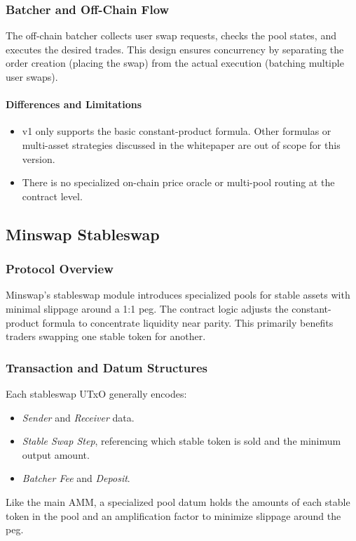 \documentclass{article}
\begin{document}
\subsubsection{Batcher and Off-Chain Flow}
The off-chain batcher collects user swap requests, checks the pool states, and executes the desired trades. This design ensures concurrency by separating the order creation (placing the swap) from the actual execution (batching multiple user swaps).

\paragraph{Differences and Limitations}
\begin{itemize}
    \item v1 only supports the basic constant-product formula. Other formulas or multi-asset strategies discussed in the whitepaper are out of scope for this version.
    \item There is no specialized on-chain price oracle or multi-pool routing at the contract level.
\end{itemize}



\subsection{Minswap Stableswap}
\label{sec:minswap_stable}

\subsubsection{Protocol Overview}
Minswap’s stableswap module introduces specialized pools for stable assets with minimal slippage around a 1:1 peg. The contract logic adjusts the constant-product formula to concentrate liquidity near parity. This primarily benefits traders swapping one stable token for another.

\subsubsection{Transaction and Datum Structures}
Each stableswap UTxO generally encodes:
\begin{itemize}
    \item \emph{Sender} and \emph{Receiver} data.
    \item \emph{Stable Swap Step}, referencing which stable token is sold and the minimum output amount.
    \item \emph{Batcher Fee} and \emph{Deposit}.
\end{itemize}
Like the main AMM, a specialized pool datum holds the amounts of each stable token in the pool and an amplification factor to minimize slippage around the peg.
\end{document}
